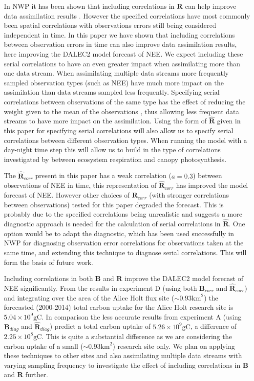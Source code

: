 \documentclass[11pt]{article}
\begin{document}
In NWP it has been shown that including correlations in $\textbf{R}$ can help improve data assimilation results \citep{weston2014accounting}. However the specified correlations have most commonly been spatial correlations with observations errors still being considered independent in time. In this paper we have shown that including correlations between observation errors in time can also improve data assimilation results, here improving the DALEC2 model forecast of NEE. We expect including these serial correlations to have an even greater impact when assimilating more than one data stream. When assimilating multiple data streams more frequently sampled observation types (such as NEE) have much more impact on the assimilation than data streams sampled less frequently. Specifying serial correlations between observations of the same type has the effect of reducing the weight given to the mean of the observations \citep{jarvinen1999variational}, thus allowing less frequent data streams to have more impact on the assimilation. Using the form of $\hat{\mathbf{R}}$ given in this paper for specifying serial correlations will also allow us to specify serial correlations between different observation types. When running the model with a day-night time step this will allow us to build in the type of correlations investigated by \citet{Baldocchi2015} between ecosystem respiration and canopy photosynthesis. 

The $\hat{\mathbf{R}}_{corr}$ present in this paper has a weak correlation ($a=0.3$) between observations of NEE in time, this representation of $\hat{\mathbf{R}}_{corr}$ has improved the model forecast of NEE. However other choices of $\hat{\mathbf{R}}_{corr}$ (with stronger correlations between observations) tested for this paper degraded the forecast. This is probably due to the specified correlations being unrealistic and suggests a more diagnostic approach is needed for the calculation of serial correlations in $\hat{\mathbf{R}}$. One option would be to adapt the \citet{desroziers2005diagnosis} diagnostic, which has been used successfully in NWP for diagnosing observation error correlations for observations taken at the same time, and extending this technique to diagnose serial correlations. This will form the basis of future work.

Including correlations in both $\textbf{B}$ and $\textbf{R}$ improve the DALEC2 model forecast of NEE significantly. From the results in experiment D (using both $\textbf{B}_{corr}$ and $\hat{\textbf{R}}_{corr}$) and integrating over the area of the Alice Holt flux site ($\sim 0.93\text{km}^2$) the forecasted (2000-2014) total carbon uptake for the Alice Holt research site is $5.04\times 10^9 \text{gC}$. In comparison the less accurate results from experiment A (using $\textbf{B}_{diag}$ and $\hat{\textbf{R}}_{diag}$) predict a total carbon uptake of $5.26 \times 10^9\text{gC}$, a difference of $2.25 \times 10^8\text{gC}$. This is quite a substantial difference as we are considering the carbon uptake of a small ($\sim 0.93\text{km}^2$) research site only. We plan on applying these techniques to other sites and also assimilating multiple data streams with varying sampling frequency to investigate the effect of including correlations in $\textbf{B}$ and $\textbf{R}$ further. 
\end{document}
